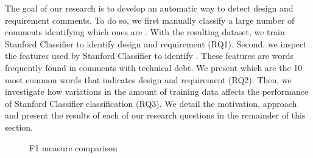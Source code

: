 The goal of our research is to develop an automatic way to detect design and requirement \SATD comments. To do so, we first manually classify a large number of comments identifying which ones are \SATD. With the resulting dataset, we train Stanford Classifier to identify design and requirement \SATD (RQ1). Second, we inspect the features used by Stanford Classifier to identify \SATD. These features are words frequently found in comments with technical debt. We present which are the 10 most common words that indicates design and requirement \SATD (RQ2). Then, we investigate how variations in the amount of training data affects the performance of Stanford Classifier classification (RQ3). We detail the motivation, approach and present the results of each of our research questions in the remainder of this section.    

\begin{figure}[!thb]
  \centering
  \caption{F1 measure comparison}
\end{figure}

